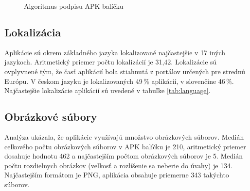 \begin{figure}[!htbp]
\centering
{}
\label{fig:signAlg}
\caption{Algoritmus podpisu APK balíčku}
\end{figure}

\subsection*{Lokalizácia}
Aplikácie sú okrem základného jazyka lokalizované najčastejšie v 17 iných jazykoch. Aritmetický priemer počtu lokalizácií je 31,42. Lokalizácie sú ovplyvnené tým, že časť aplikácií bola stiahnutá z portálov určených pre strednú Európu. V českom jazyku je lokalizovaných 49\,\% aplikácií, v slovenčine 46\,\%. Najčastejšie lokalizácie aplikácií sú uvedené v tabuľke \ref{tab:language}.


\subsection*{Obrázkové súbory}
Analýza ukázala, že aplikácie využívajú množstvo obrázkových súborov. Medián celkového počtu obrázkových súborov v APK balíčku je 210, aritmetický priemer dosahuje hodnotu 462 a najčastejším počtom obrázkových súborov je 5. Medián počtu rozdielnych obrázkov (veľkosť a rozlíšenie sa neberie do úvahy) je 134. Najčastejším formátom je PNG, aplikácia obsahuje priemerne 343 takýchto súborov.